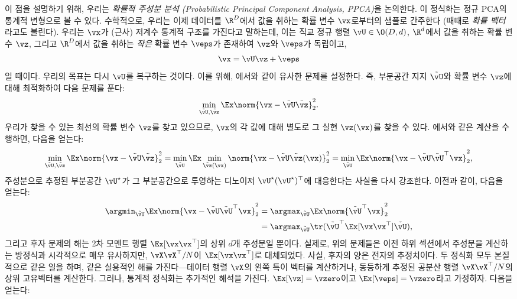 \documentclass[../../book-main_ko.tex]{subfiles}
\begin{document}
이 점을 설명하기 위해, 우리는 \textit{확률적 주성분 분석 (Probabilistic Principal Component Analysis, PPCA)}을 논의한다. 이 정식화는 정규 PCA의 통계적 변형으로 볼 수 있다. 수학적으로, 우리는 이제 데이터를 \(\R^{D}\)에서 값을 취하는 확률 변수 \(\vx\)로부터의 샘플로 간주한다 (때때로 \textit{확률 벡터}라고도 불린다). 우리는 \(\vx\)가 (근사) 저계수 통계적 구조를 가진다고 말하는데, 이는 직교 정규 행렬 \(\vU \in \O(D, d)\), \(\R^{d}\)에서 값을 취하는 확률 변수 \(\vz\), 그리고 \(\R^{D}\)에서 값을 취하는 \textit{작은} 확률 변수 \(\veps\)가 존재하여 \(\vz\)와 \(\veps\)가 독립이고,
\begin{equation}
    \vx = \vU\vz + \veps
\end{equation}
일 때이다. 우리의 목표는 다시 \(\vU\)를 복구하는 것이다. 이를 위해, 에서와 같이 유사한 문제를 설정한다. 즉, 부분공간 지지 \(\tilde{\vU}\)와 확률 변수 \(\vz\)에 대해 최적화하여 다음 문제를 푼다:
\begin{equation}
    \min_{\tilde{\vU}, \tilde{\vz}}\Ex\norm{\vx - \tilde{\vU}\tilde{\vz}}_{2}^{2}.
\end{equation}
우리가 찾을 수 있는 최선의 확률 변수 \(\vz\)를 찾고 있으므로, \(\vx\)의 각 값에 대해 별도로 그 실현 \(\vz(\vx)\)를 찾을 수 있다. 에서와 같은 계산을 수행하면, 다음을 얻는다: %
\begin{equation}\label{eq:ppca_denoising}
    \min_{\tilde{\vU}, \tilde{\vz}}\Ex\norm{\vx - \tilde{\vU}\tilde{\vz}}_{2}^{2} = \min_{\tilde{\vU}}\Ex\min_{\tilde{\vz}(\vx)}\norm{\vx - \tilde{\vU}\tilde{\vz}(\vx)}_{2}^{2} = \min_{\tilde{\vU}}\Ex\norm{\vx - \tilde{\vU}\tilde{\vU}^{\top}\vx}_{2}^{2},
\end{equation}
주성분으로 추정된 부분공간 \(\vU^{\star}\)가 그 부분공간으로 투영하는 디노이저 \(\vU^{\star}(\vU^{\star})^{\top}\)에 대응한다는 사실을 다시 강조한다. 이전과 같이, 다음을 얻는다:
\begin{align}\label{eq:PPCA}
    \argmin_{\tilde{\vU}}\Ex\norm{\vx - \tilde{\vU}\tilde{\vU}^{\top}\vx}_{2}^{2}
    &= \argmax_{\tilde{\vU}}\Ex\norm{\tilde{\vU}^{\top}\vx}_{2}^{2} \\
    &= \argmax_{\tilde{\vU}}\tr(\tilde{\vU}^{\top}\Ex[\vx\vx^{\top}]\tilde{\vU}),
\end{align}
그리고 후자 문제의 해는 2차 모멘트 행렬 \(\Ex[\vx\vx^{\top}]\)의 상위 \(d\)개 주성분일 뿐이다. 실제로, 위의 문제들은 이전 하위 섹션에서 주성분을 계산하는 방정식과 시각적으로 매우 유사하지만, \(\vX\vX^{\top}/N\)이 \(\Ex[\vx\vx^{\top}]\)로 대체되었다. 사실, 후자의 양은 전자의 추정치이다. 두 정식화 모두 본질적으로 같은 일을 하며, 같은 실용적인 해를 가진다---데이터 행렬 \(\vX\)의 왼쪽 특이 벡터를 계산하거나, 동등하게 추정된 공분산 행렬 \(\vX\vX^{\top}/N\)의 상위 고유벡터를 계산한다. 그러나, 통계적 정식화는 추가적인 해석을 가진다. \(\Ex[\vz] = \vzero\)이고 \(\Ex[\veps] = \vzero\)라고 가정하자. 다음을 얻는다:
\end{document}
